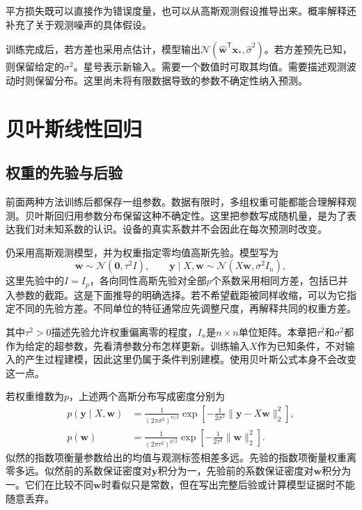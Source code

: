 平方损失既可以直接作为错误度量，也可以从高斯观测假设推导出来。概率解释还补充了关于观测噪声的具体假设。

训练完成后，若方差也采用点估计，模型输出$\mathcal N(\hat{\bm w}^{\mathsf T}\bm x_*,\hat\sigma^2)$。若方差预先已知，则保留给定的$\sigma^2$。星号表示新输入。需要一个数值时可取其均值。需要描述观测波动时则保留分布。这里尚未将有限数据导致的参数不确定性纳入预测。

\section{贝叶斯线性回归}
\subsection{权重的先验与后验}
前面两种方法训练后都保存一组参数。数据有限时，多组权重可能都能合理解释观测。贝叶斯回归用参数分布保留这种不确定性\cite{bishop2006pattern,murphy2022pml}。这里把参数写成随机量，是为了表达我们对未知系数的认识。设备的真实系数并不会因此在每次预测时改变。

仍采用高斯观测模型，并为权重指定零均值高斯先验。模型写为
\begin{equation}
 \bm w\sim\mathcal N(\bm0,\tau^2I),\qquad
 \bm y\mid X,\bm w\sim\mathcal N(X\bm w,\sigma^2I_n),
\end{equation}
这里先验中的$I=I_p$，各向同性高斯先验对全部$p$个系数采用相同方差，包括已并入参数的截距。这是下面推导的明确选择。若不希望截距被同样收缩，可以为它指定不同的先验方差。不同单位的特征通常应先调整尺度，再解释共同的权重方差。

其中$\tau^2>0$描述先验允许权重偏离零的程度，$I_n$是$n\times n$单位矩阵。本章把$\tau^2$和$\sigma^2$都作为给定的超参数，先看清参数分布怎样更新。训练输入$X$作为已知条件，不对输入的产生过程建模，因此这里仍属于条件判别建模。使用贝叶斯公式本身不会改变这一点。

若权重维数为$p$，上述两个高斯分布写成密度分别为
\begin{align}
 p(\bm y\mid X,\bm w)
 &=\frac{1}{(2\pi\sigma^2)^{n/2}}
 \exp\left[-\frac{1}{2\sigma^2}
 \|\bm y-X\bm w\|_2^2\right],\label{eq:linear-gaussian-likelihood}\\
 p(\bm w)
 &=\frac{1}{(2\pi\tau^2)^{p/2}}
 \exp\left[-\frac{1}{2\tau^2}\|\bm w\|_2^2\right].
 \label{eq:linear-gaussian-prior-density}
\end{align}
似然的指数项衡量参数给出的均值与观测标签相差多远。先验的指数项衡量权重离零多远。似然前的系数保证密度对$\bm y$积分为一，先验前的系数保证密度对$\bm w$积分为一。它们在比较不同$\bm w$时看似只是常数，但在写出完整后验或计算模型证据时不能随意丢弃。

